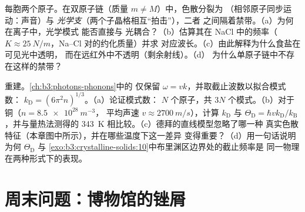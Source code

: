 \begin{exercise}[$\star\star\star$]\label{exo:b3:crystalline-solids:11}
每胞两个原子。在双原子链（质量 $m \ne M$）中，色散分裂为
\emph{}（相邻原子同步运动：声音）与
\emph{光学支}（两个子晶格相互“拍击”），二者
之间隔着禁带。（a）为何在离子中，光学模式
能否直接与
光耦合？（b）估算其在 NaCl 中的频率（$K \approx
\qty{25}{N/m}$，Na--Cl 对的约化质量）并求
对应波长。（c）由此解释为什么食盐在可见光中透明，
而在远红外中不透明（剩余射线）。（d）
为什么单原子链中不存在这样的禁带？
\end{exercise}

\begin{exercise}[$\star\star\star$]\label{exo:b3:crystalline-solids:12}
重建。\cref{ch:b3:photons-phonons}中的
仅保留 $\omega = vk$，并取截止波数以拟合模式数：
$k_{\text{D}} = (6\pi^2n)^{1/3}$。（a）论证模式数：
$N$ 个原子，共 $3N$ 个模式。（b）对于铜（$n = \qty{8.5e28}{m^{-3}}$，
平均声速 $v \approx \qty{2700}{m/s}$），计算
$k_{\text{D}}$ 与 $\Theta_{\text{D}} =
\hbar vk_{\text{D}}/k_{\text{B}}$，并与量热法测得的
\qty{343}{K} 相比较。（c）德拜的直线模型忽略了哪一种
真实色散特征（本章图中所示），并在哪些温度下这一差异
变得重要？（d）用一句话说明为何
$\Theta_{\text{D}}$ 与
\cref{exo:b3:crystalline-solids:10}中布里渊区边界处的截止频率是
同一物理在两种形式下的表现。
\end{exercise}

\section{周末问题：博物馆的锉屑}

